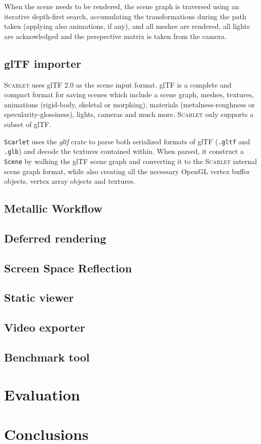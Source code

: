 \documentclass[11pt,a4paper]{report}
\begin{document}
When the scene needs to be rendered, the scene graph is traversed using an iterative depth-first search, accumulating the transformations during the path taken (applying also animations, if any), and all meshes are rendered, all lights are acknowledged and the perspective matrix is taken from the camera.

\section{glTF importer}
\textsc{Scarlet} uses glTF 2.0 as the scene input format. glTF is a complete and compact format for saving scenes which include a scene graph, meshes, textures, animations (rigid-body, skeletal or morphing), materials (metalness-roughness or specularity-glossiness), lights, cameras and much more. \textsc{Scarlet} only supports a subset of glTF.

\texttt{Scarlet} uses the \textit{gltf} crate to parse both serialized formats of glTF (\texttt{.gltf} and \texttt{.glb}) and decode the textures contained within. When parsed, it construct a \texttt{Scene} by walking the glTF scene graph and converting it to the \textsc{Scarlet} internal scene graph format, while also creating all the necessary OpenGL vertex buffer objects, vertex array objects and textures.

\section{Metallic Workflow}

\section{Deferred rendering}

\section{Screen Space Reflection}

\section{Static viewer}

\section{Video exporter}

\section{Benchmark tool}

\chapter{Evaluation}

\chapter{Conclusions}
\end{document}

